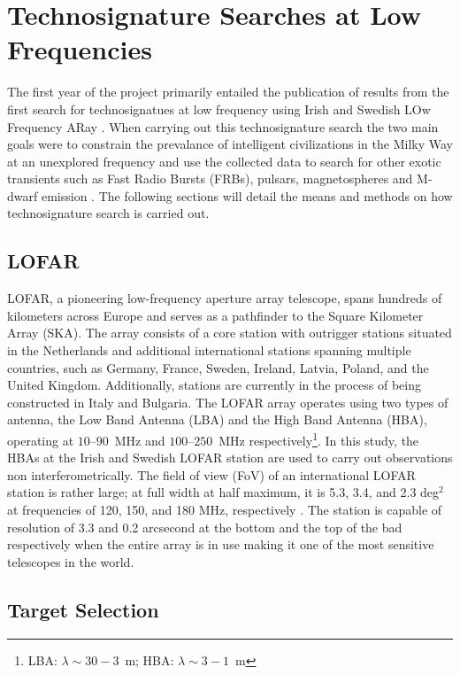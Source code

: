 \section{Technosignature Searches at Low Frequencies} \label{sec:method-technosignature-searches}

The first year of the project primarily entailed the publication \citep{johnson_simultaneous_2023} of results from the first search for technosignatues at low frequency using Irish and Swedish LOw Frequency ARay \citep[I-LOFAR;][] {van_haarlem_lofar_2013}. When carrying out this technosignature search the two main goals were to constrain the prevalance of intelligent civilizations in the Milky Way at an unexplored frequency and use the collected data to search for other exotic transients such as Fast Radio Bursts (FRBs), pulsars, magnetospheres and M-dwarf emission \citep{sheikh_nine_2020}. The following sections will detail the means and methods on how technosignature search is carried out.

\subsection{LOFAR}

LOFAR, a pioneering low-frequency aperture array telescope, spans hundreds of kilometers across Europe and serves as a pathfinder to the Square Kilometer Array (SKA). The array consists of a core station with outrigger stations situated in the Netherlands and additional international stations spanning multiple countries, such as Germany, France, Sweden, Ireland, Latvia, Poland, and the United Kingdom. Additionally, stations are currently in the process of being constructed in Italy and Bulgaria. The LOFAR array operates using two types of antenna, the Low Band Antenna (LBA) and the High Band Antenna (HBA), operating at $10–90$~MHz and $100–250$~MHz respectively\footnote{LBA: $\lambda \sim30 - 3$~m; HBA: $\lambda \sim3 - 1$~m}. In this study, the HBAs at the Irish and Swedish LOFAR station are used to carry out observations non interferometrically. The field of view (FoV) of an international LOFAR station is rather large; at full width at half maximum, it is 5.3, 3.4, and 2.3 deg$^2$ at frequencies of 120, 150, and 180 MHz, respectively \citep{van_haarlem_lofar_2013}. The station is capable of resolution of 3.3 and 0.2 arcsecond at the bottom and the top of the bad respectively when the entire array is in use making it one of the most sensitive telescopes in the world.

\subsection{Target Selection}

